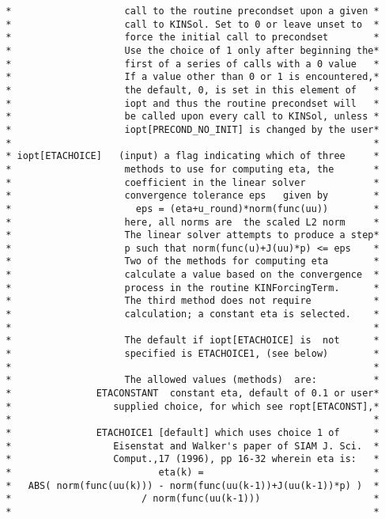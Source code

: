 \documentclass[11pt]{article}
\begin{document}
\begin{verbatim}
 *                    call to the routine precondset upon a given *
 *                    call to KINSol. Set to 0 or leave unset to  *
 *                    force the initial call to precondset        *
 *                    Use the choice of 1 only after beginning the*
 *                    first of a series of calls with a 0 value   *
 *                    If a value other than 0 or 1 is encountered,*
 *                    the default, 0, is set in this element of   *
 *                    iopt and thus the routine precondset will   *
 *                    be called upon every call to KINSol, unless *
 *                    iopt[PRECOND_NO_INIT] is changed by the user*
 *                                                                *
 * iopt[ETACHOICE]   (input) a flag indicating which of three     *
 *                    methods to use for computing eta, the       *
 *                    coefficient in the linear solver            *
 *                    convergence tolerance eps   given by        *
 *                      eps = (eta+u_round)*norm(func(uu))        *
 *                    here, all norms are  the scaled L2 norm     *
 *                    The linear solver attempts to produce a step*
 *                    p such that norm(func(u)+J(uu)*p) <= eps    *
 *                    Two of the methods for computing eta        *
 *                    calculate a value based on the convergence  *
 *                    process in the routine KINForcingTerm.      *
 *                    The third method does not require           *
 *                    calculation; a constant eta is selected.    *
 *                                                                *
 *                    The default if iopt[ETACHOICE] is  not      *
 *                    specified is ETACHOICE1, (see below)        *
 *                                                                *
 *                    The allowed values (methods)  are:          *
 *               ETACONSTANT  constant eta, default of 0.1 or user*
 *                  supplied choice, for which see ropt[ETACONST],*
 *                                                                *
 *               ETACHOICE1 [default] which uses choice 1 of      *
 *                  Eisenstat and Walker's paper of SIAM J. Sci.  *
 *                  Comput.,17 (1996), pp 16-32 wherein eta is:   *
 *                          eta(k) =                              *
 *   ABS( norm(func(uu(k))) - norm(func(uu(k-1))+J(uu(k-1))*p) )  *
 *                       / norm(func(uu(k-1)))                    *
 *                                                                *

\end{verbatim}
\end{document}
